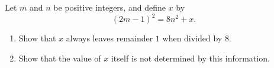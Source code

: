Let $m$ and $n$ be positive integers, and define $x$ by
\[(2m-1)^2=8n^2+x.\]
\begin{enumerate}
\item[(a)] Show that $x$ always leaves remainder $1$ when divided by $8$.
\item[(b)] Show that the value of $x$ itself is not determined by this information.
\end{enumerate}
